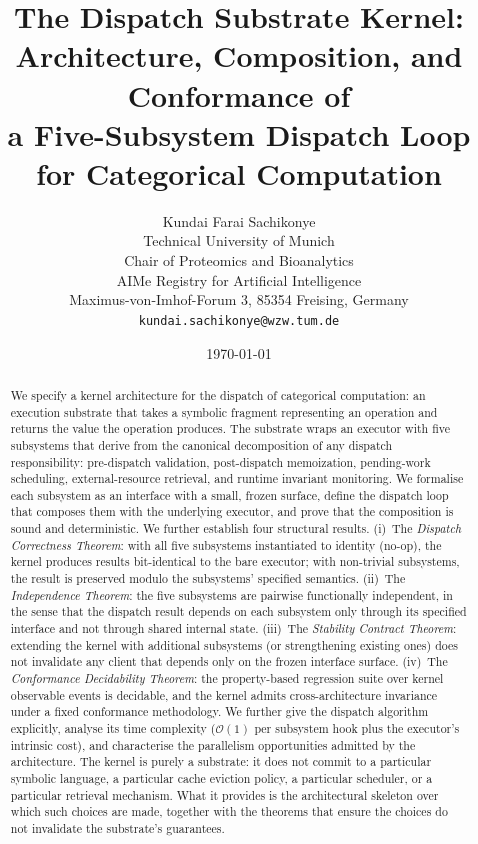 \documentclass[twocolumn,11pt,a4paper]{article}
\title{\textbf{The Dispatch Substrate Kernel:\\[3pt]
Architecture, Composition, and Conformance of\\[2pt]
a Five-Subsystem Dispatch Loop\\[2pt]
for Categorical Computation}}
\author{Kundai Farai Sachikonye\\
Technical University of Munich\\
Chair of Proteomics and Bioanalytics\\
AIMe Registry for Artificial Intelligence\\
Maximus-von-Imhof-Forum 3, 85354 Freising, Germany\\
\texttt{kundai.sachikonye@wzw.tum.de}}
\date{\today}
\begin{document}
\maketitle

\begin{abstract}
We specify a kernel architecture for the dispatch of categorical computation: an execution substrate that takes a symbolic fragment representing an operation and returns the value the operation produces. The substrate wraps an executor with five subsystems that derive from the canonical decomposition of any dispatch responsibility: pre-dispatch validation, post-dispatch memoization, pending-work scheduling, external-resource retrieval, and runtime invariant monitoring. We formalise each subsystem as an interface with a small, frozen surface, define the dispatch loop that composes them with the underlying executor, and prove that the composition is sound and deterministic. We further establish four structural results. (i)~The \emph{Dispatch Correctness Theorem}: with all five subsystems instantiated to identity (no-op), the kernel produces results bit-identical to the bare executor; with non-trivial subsystems, the result is preserved modulo the subsystems' specified semantics. (ii)~The \emph{Independence Theorem}: the five subsystems are pairwise functionally independent, in the sense that the dispatch result depends on each subsystem only through its specified interface and not through shared internal state. (iii)~The \emph{Stability Contract Theorem}: extending the kernel with additional subsystems (or strengthening existing ones) does not invalidate any client that depends only on the frozen interface surface. (iv)~The \emph{Conformance Decidability Theorem}: the property-based regression suite over kernel observable events is decidable, and the kernel admits cross-architecture invariance under a fixed conformance methodology. We further give the dispatch algorithm explicitly, analyse its time complexity ($\mathcal{O}(1)$ per subsystem hook plus the executor's intrinsic cost), and characterise the parallelism opportunities admitted by the architecture. The kernel is purely a substrate: it does not commit to a particular symbolic language, a particular cache eviction policy, a particular scheduler, or a particular retrieval mechanism. What it provides is the architectural skeleton over which such choices are made, together with the theorems that ensure the choices do not invalidate the substrate's guarantees.
\end{abstract}
\end{document}
